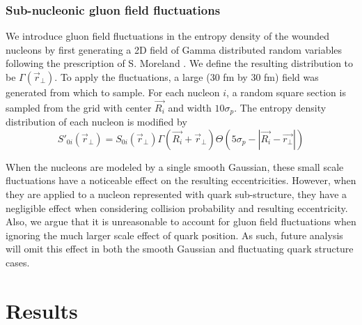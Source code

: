 \documentclass[twocolumn,showpacs,amsfonts,aps,prc,nofootinbib,floatfix]{revtex4}
\begin{document}
\begin{figure}
	\caption{}
	\label{fig:CollisionComaprison}
\end{figure}


\subsubsection{Sub-nucleonic gluon field fluctuations}
\label{sec2b2}
We introduce gluon field fluctuations in the entropy density of the wounded nucleons by first generating a 2D field of Gamma distributed random variables following the prescription of S. Moreland \cite{Moreland:2012qw}. We define the resulting distribution to be $\Gamma(\vec{r}_\perp)$. To apply the fluctuations, a large (30 fm by 30 fm) field was generated from which to sample. For each nucleon $i$, a random square section is sampled from the grid with center $\vec{R_i}$ and width $10\sigma_p$. The entropy density distribution of each nucleon is modified by 
\begin{equation}
	S'_{0i}(\vec{r}_\perp) = S_{0i}(\vec{r}_\perp) \Gamma(\vec{R_i} + \vec{r}_\perp) \Theta(5\sigma_p - |{\vec{R_i}-\vec{r_\perp}}|)
\end{equation}

When the nucleons are modeled by a single smooth Gaussian, these small scale fluctuations have a noticeable effect on the resulting eccentricities. However, when they are applied to a nucleon represented with quark sub-structure, they have a negligible effect when considering collision probability and resulting eccentricity. Also, we argue that it is unreasonable to account for gluon field fluctuations when ignoring the much larger scale effect of quark position. As such, future analysis will omit this effect in both the smooth Gaussian and fluctuating quark structure cases.

\section{Results}
\label{sec:Results}
\end{document}
